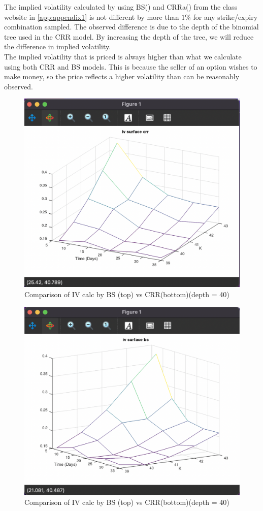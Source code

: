 \documentclass{article}
\begin{document}
\FloatBarrier
The implied volatility calculated by using BS() and CRRa() from the class website in \ref{app:appendix1} is not different by more than $1\%$ for any strike/expiry combination sampled. The observed difference is due to the depth of the binomial tree used in the CRR model. By increasing the depth of the tree, we will reduce the difference in implied volatility.\\
\hspace*{0.5cm}The implied volatility that is priced is always higher than what we calculate using both CRR and BS models. This is because the seller of an option wishes to make money, so the price reflects a higher volatility than can be reasonably observed.
\FloatBarrier
\begin{figure}
    \centering
    \includegraphics[width=0.8\linewidth]{crr.png}
    \caption{Comparison of IV calc by BS (top) vs CRR(bottom)(depth = 40)}
    \label{IV comparison of bs (top) vs crr(bottom)}
\end{figure}
\FloatBarrier
\begin{figure}
    \centering
    \includegraphics[width=0.8\linewidth]{bs.png}
    \caption{Comparison of IV calc by BS (top) vs CRR(bottom)(depth = 40)}
    \label{IV comparison of bs (top) vs crr(bottom)}
\end{figure}
\FloatBarrier
\end{document}
